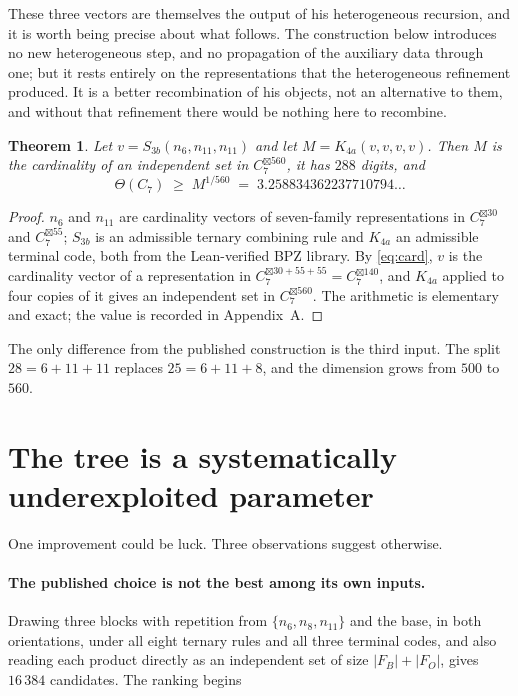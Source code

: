 \documentclass[11pt]{article}
\newtheorem{theorem}{Theorem}
\theoremstyle{definition}
\begin{document}
These three vectors are themselves the output of his heterogeneous recursion, and it is worth
being precise about what follows. The construction below introduces no new heterogeneous step,
and no propagation of the auxiliary data through one; but it rests entirely on the
representations that the heterogeneous refinement produced. It is a better recombination of
his objects, not an alternative to them, and without that refinement there would be nothing
here to recombine.

\begin{theorem}\label{thm:main}
Let $v = S_{3b}(n_6, n_{11}, n_{11})$ and let $M = K_{4a}(v,v,v,v)$. Then $M$ is the cardinality
of an independent set in $C_7^{\boxtimes 560}$, it has $288$ digits, and
\[
  \Theta(C_7) \;\ge\; M^{1/560} \;=\; 3.258834362237710794\ldots
\]
\end{theorem}

\begin{proof}
$n_6$ and $n_{11}$ are cardinality vectors of seven-family representations in
$C_7^{\boxtimes 30}$ and $C_7^{\boxtimes 55}$; $S_{3b}$ is an admissible ternary combining rule
and $K_{4a}$ an admissible terminal code, both from the Lean-verified BPZ library. By
\eqref{eq:card}, $v$ is the cardinality vector of a representation in
$C_7^{\boxtimes 30+55+55} = C_7^{\boxtimes 140}$, and $K_{4a}$ applied to four copies of it gives
an independent set in $C_7^{\boxtimes 560}$. The arithmetic is elementary and exact; the value is
recorded in Appendix~A.
\end{proof}

The only difference from the published construction is the third input. The split
$28 = 6 + 11 + 11$ replaces $25 = 6 + 11 + 8$, and the dimension grows from $500$ to $560$.

\section{The tree is a systematically underexploited parameter}

One improvement could be luck. Three observations suggest otherwise.

\paragraph{The published choice is not the best among its own inputs.}
Drawing three blocks with repetition from $\{n_6, n_8, n_{11}\}$ and the base, in both
orientations, under all eight ternary rules and all three terminal codes, and also reading each
product directly as an independent set of size $|F_B| + |F_O|$, gives $16\,384$ candidates. The
ranking begins
\end{document}

